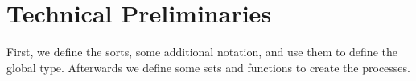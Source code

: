 \chapter{Technical Preliminaries}

First, we define the sorts, some additional notation, and use them to define the global type.
Afterwards we define some sets and functions to create the processes.

